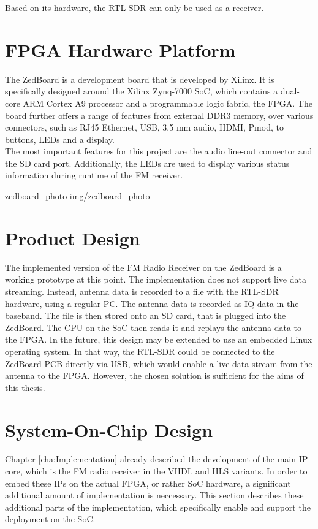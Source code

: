 \noindent
Based on its hardware, the RTL-SDR can only be used as a receiver.


\section{FPGA Hardware Platform}

The ZedBoard is a development board that is developed by Xilinx.
It is specifically designed around the Xilinx Zynq-7000 SoC, which contains a dual-core ARM Cortex A9 processor and a programmable logic fabric, the FPGA.
The board further offers a range of features from external DDR3 memory, over various connectors, such as RJ45 Ethernet, USB, 3.5 mm audio, HDMI, Pmod, to buttons, LEDs and a display.\\

The most important features for this project are the audio line-out connector and the SD card port.
Additionally, the LEDs are used to display various status information during runtime of the FM receiver.

 {zedboard_photo} {img/zedboard_photo}

\section{Product Design}

The implemented version of the FM Radio Receiver on the ZedBoard is a working prototype at this point.
The implementation does not support live data streaming.
Instead, antenna data is recorded to a file with the RTL-SDR hardware, using a regular PC.
The antenna data is recorded as IQ data in the baseband.
The file is then stored onto an SD card, that is plugged into the ZedBoard.
The CPU on the SoC then reads it and replays the antenna data to the FPGA.
In the future, this design may be extended to use an embedded Linux operating system.
In that way, the RTL-SDR could be connected to the ZedBoard PCB directly via USB, which would enable a live data stream from the antenna to the FPGA.
However, the chosen solution is sufficient for the aims of this thesis.

\section{System-On-Chip Design}

Chapter \ref{cha:Implementation} already described the development of the main IP core, which is the FM radio receiver in the VHDL and HLS variants.
In order to embed these IPs on the actual FPGA, or rather SoC hardware, a significant additional amount of implementation is neccessary.
This section describes these additional parts of the implementation, which specifically enable and support the deployment on the SoC.

